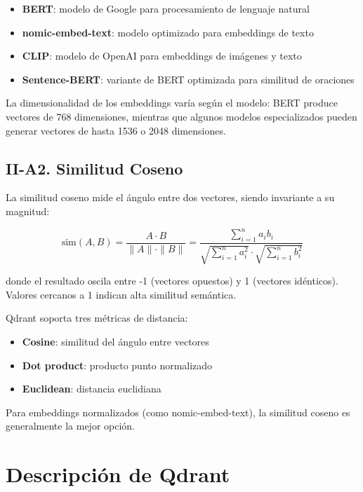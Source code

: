 \documentclass[conference]{IEEEtran}
\begin{document}
\begin{itemize}
    \item \textbf{BERT}: modelo de Google para procesamiento de lenguaje natural
    \item \textbf{nomic-embed-text}: modelo optimizado para embeddings de texto
    \item \textbf{CLIP}: modelo de OpenAI para embeddings de imágenes y texto
    \item \textbf{Sentence-BERT}: variante de BERT optimizada para similitud de oraciones
\end{itemize}

La dimensionalidad de los embeddings varía según el modelo: BERT produce vectores de 768 dimensiones, mientras que algunos modelos especializados pueden generar vectores de hasta 1536 o 2048 dimensiones.

\subsection{II-A2. Similitud Coseno}

La similitud coseno mide el ángulo entre dos vectores, siendo invariante a su magnitud:

\begin{equation}
    \text{sim}(A, B) = \frac{A \cdot B}{\|A\| \cdot \|B\|} = \frac{\sum_{i=1}^{n} a_i b_i}{\sqrt{\sum_{i=1}^{n} a_i^2} \cdot \sqrt{\sum_{i=1}^{n} b_i^2}}
    \label{eq:cosine}
\end{equation}

donde el resultado oscila entre -1 (vectores opuestos) y 1 (vectores idénticos). Valores cercanos a 1 indican alta similitud semántica.

Qdrant soporta tres métricas de distancia:

\begin{itemize}
    \item \textbf{Cosine}: similitud del ángulo entre vectores
    \item \textbf{Dot product}: producto punto normalizado
    \item \textbf{Euclidean}: distancia euclidiana
\end{itemize}

Para embeddings normalizados (como nomic-embed-text), la similitud coseno es generalmente la mejor opción.

\section{Descripción de Qdrant}
\label{sec:descripcion}
\end{document}

